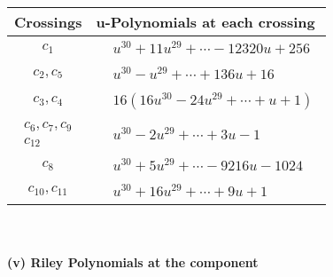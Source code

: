 \documentclass[1p]{elsarticle_modified}
\theoremstyle{definition}
\begin{document}
\begin{tabular}{m{50pt}|m{274pt}}
Crossings & \hspace{64pt}u-Polynomials at each crossing \\
\hline $$\begin{aligned}c_{1}\end{aligned}$$&$\begin{aligned}
&u^{30}+11 u^{29}+\cdots-12320 u+256
\end{aligned}$\\
\hline $$\begin{aligned}c_{2},c_{5}\end{aligned}$$&$\begin{aligned}
&u^{30}- u^{29}+\cdots+136 u+16
\end{aligned}$\\
\hline $$\begin{aligned}c_{3},c_{4}\end{aligned}$$&$\begin{aligned}
&16(16 u^{30}-24 u^{29}+\cdots+u+1)
\end{aligned}$\\
\hline $$\begin{aligned}c_{6},c_{7},c_{9}\\c_{12}\end{aligned}$$&$\begin{aligned}
&u^{30}-2 u^{29}+\cdots+3 u-1
\end{aligned}$\\
\hline $$\begin{aligned}c_{8}\end{aligned}$$&$\begin{aligned}
&u^{30}+5 u^{29}+\cdots-9216 u-1024
\end{aligned}$\\
\hline $$\begin{aligned}c_{10},c_{11}\end{aligned}$$&$\begin{aligned}
&u^{30}+16 u^{29}+\cdots+9 u+1
\end{aligned}$\\
\hline
\end{tabular}\\~\\
\newpage\renewcommand{\arraystretch}{1}
\flushleft \textbf{(v) Riley Polynomials at the component}\newline \\
\end{document}
